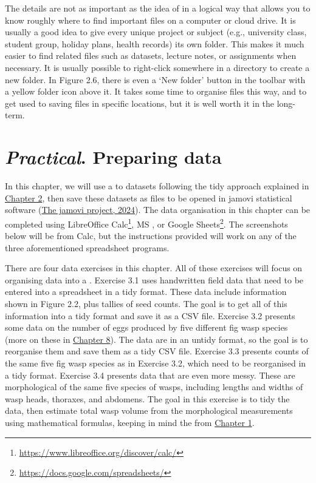 \documentclass[
  openany]{krantz}
\renewcommand{\href}[2]{#2\footnote{\url{#1}}}
\begin{document}
The details are not as important as the idea of  in a logical way that allows you to know roughly where to find important files on a computer or cloud drive.
It is usually a good idea to give every unique project or subject (e.g., university class, student group, holiday plans, health records) its own folder.
This makes it much easier to find related files such as datasets, lecture notes, or assignments when necessary.
It is usually possible to right-click somewhere in a directory to create a new folder.
In Figure 2.6, there is even a `New folder' button in the toolbar with a yellow folder icon above it.
It takes some time to organise files this way, and to get used to saving files in specific locations, but it is well worth it in the long-term.

\hypertarget{Chapter_3}{%
\chapter{\texorpdfstring{\emph{Practical}. Preparing data}{Practical. Preparing data}}\label{Chapter_3}}

In this chapter, we will use a  to  datasets following the tidy approach explained in \protect\hyperlink{Chapter_2}{Chapter 2}, then save these datasets as  files to be opened in jamovi statistical software (\protect\hyperlink{ref-Jamovi2022}{The jamovi project, 2024}).
The data organisation in this chapter can be completed using \href{https://www.libreoffice.org/discover/calc/}{LibreOffice Calc}, MS , or \href{https://docs.google.com/spreadsheets/}{Google Sheets}.
The screenshots below will be from  Calc, but the instructions provided will work on any of the three aforementioned spreadsheet programs.

There are four data exercises in this chapter.
All of these exercises will focus on organising data into a .
Exercise 3.1 uses handwritten field data that need to be entered into a spreadsheet in a tidy format.
These data include information shown in Figure 2.2, plus tallies of seed counts.
The goal is to get all of this information into a tidy format and save it as a CSV file.
Exercise 3.2 presents some data on the number of eggs produced by five different fig wasp species (more on these in \protect\hyperlink{Chapter_8}{Chapter 8}).
The data are in an untidy format, so the goal is to reorganise them and save them as a tidy CSV file.
Exercise 3.3 presents counts of the same five fig wasp species as in Exercise 3.2, which need to be reorganised in a tidy format.
Exercise 3.4 presents data that are even more messy.
These are morphological  of the same five species of wasps, including lengths and widths of wasp heads, thoraxes, and abdomens.
The goal in this exercise is to tidy the data, then estimate total wasp volume from the morphological measurements using mathematical formulas, keeping in mind the  from \protect\hyperlink{Chapter_1}{Chapter 1}.
\end{document}
